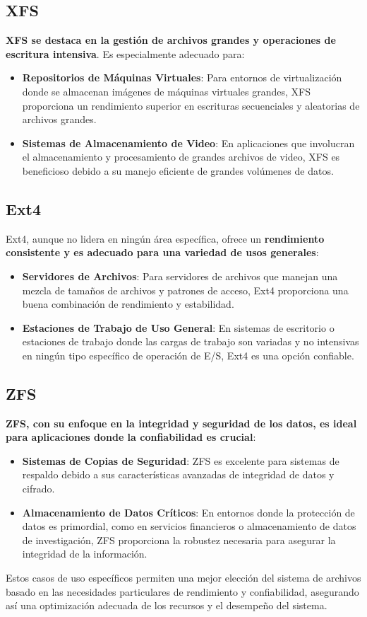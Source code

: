 \subsection{XFS}

\textbf{XFS se destaca en la gestión de archivos grandes y operaciones de escritura intensiva}. Es especialmente adecuado para:

\begin{itemize}
    \item \textbf{Repositorios de Máquinas Virtuales}: Para entornos de virtualización donde se almacenan imágenes de máquinas virtuales grandes, XFS proporciona un rendimiento superior en escrituras secuenciales y aleatorias de archivos grandes.
    \item \textbf{Sistemas de Almacenamiento de Video}: En aplicaciones que involucran el almacenamiento y procesamiento de grandes archivos de video, XFS es beneficioso debido a su manejo eficiente de grandes volúmenes de datos.
\end{itemize}

\subsection{Ext4}

Ext4, aunque no lidera en ningún área específica, ofrece un \textbf{rendimiento consistente y es adecuado para una variedad de usos generales}:

\begin{itemize}
    \item \textbf{Servidores de Archivos}: Para servidores de archivos que manejan una mezcla de tamaños de archivos y patrones de acceso, Ext4 proporciona una buena combinación de rendimiento y estabilidad.
    \item \textbf{Estaciones de Trabajo de Uso General}: En sistemas de escritorio o estaciones de trabajo donde las cargas de trabajo son variadas y no intensivas en ningún tipo específico de operación de E/S, Ext4 es una opción confiable.
\end{itemize}

\subsection{ZFS}

\textbf{ZFS, con su enfoque en la integridad y seguridad de los datos, es ideal para aplicaciones donde la confiabilidad es crucial}:

\begin{itemize}
    \item \textbf{Sistemas de Copias de Seguridad}: ZFS es excelente para sistemas de respaldo debido a sus características avanzadas de integridad de datos y cifrado.
    \item \textbf{Almacenamiento de Datos Críticos}: En entornos donde la protección de datos es primordial, como en servicios financieros o almacenamiento de datos de investigación, ZFS proporciona la robustez necesaria para asegurar la integridad de la información.
\end{itemize}

Estos casos de uso específicos permiten una mejor elección del sistema de archivos basado en las necesidades particulares de rendimiento y confiabilidad, asegurando así una optimización adecuada de los recursos y el desempeño del sistema.



